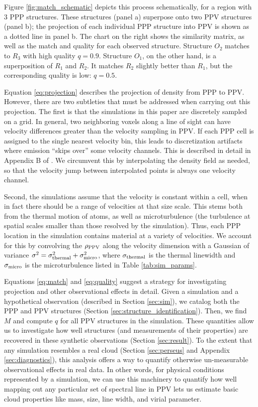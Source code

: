 Figure \ref{fig:match_schematic} depicts this process schematically, for a region with 3 PPP structures. These structures (panel a) superpose onto two PPV structures (panel b); the projection of each individual PPP structure into PPV is shown as a dotted line in panel b. The chart on the right shows the similarity matrix, as well as the match and quality for each observed structure. Structure $O_2$ matches to $R_3$ with high quality $q=0.9$. Structure $O_1$, on the other hand, is a superposition of $R_1$ and $R_2$. It matches $R_2$ slightly better than $R_1$, but the corresponding quality is low: $q=0.5$.

Equation \ref{eq:projection} describes the projection of density from PPP to PPV. However, there are two subtleties that must be addressed when carrying out this projection. The first is that the simulations in this paper are discretely sampled on a grid. In general, two neighboring voxels along a line of sight can have velocity differences greater than the velocity sampling in PPV. If each PPP cell is assigned to the single nearest velocity bin, this leads to discretization artifacts where emission ``skips over'' some velocity channels. This is described in detail in Appendix B of \cite{http://adsabs.harvard.edu/abs/2011MNRAS.415.3253S}. We circumvent this by interpolating the density field as needed, so that the velocity jump between interpolated points is always one velocity channel.

Second, the simulations assume that the velocity is constant within a cell, when in fact there should be a range of velocities at that size scale. This stems both from the thermal motion of atoms, as well as microturbulence (the turbulence at spatial scales smaller than those resolved by the simulation). Thus, each PPP location in the simulation contains material at a variety of velocities. We account for this by convolving the $\rho_{\rm PPV}$ along the velocity dimension with a Gaussian of variance $\sigma^2 = \sigma_{\rm thermal}^2 + \sigma_{\rm micro}^2$, where $\sigma_{\rm thermal}$ is the thermal linewidth and $\sigma_{\rm micro}$ is the microturbulence listed in Table \ref{tab:sim_params}.

Equations \ref{eq:match} and \ref{eq:quality} suggest a strategy for investigating projection and other observational effects in detail. Given a simulation and a hypothetical observation (described in Section \ref{sec:sim}), we catalog both the PPP and PPV structures (Section \ref{sec:structure_identification}). Then, we find $M$ and compute $q$ for all PPV structures in the simulation. These quantities allow us to investigate how well structures (and measurements of their properties) are recovered in these synthetic observations (Section \ref{sec:result}). To the extent that any simulation resembles a real cloud (Section \ref{sec:perseus} and Appendix \ref{sec:diagnostics}), this analysis offers a way to quantify otherwise un-measurable observational effects in real data. In other words, for physical conditions represented by a simulation, we can use this machinery to quantify how well mapping out any particular set of spectral line in PPV lets us estimate basic cloud properties like mass, size, line width, and virial parameter.

